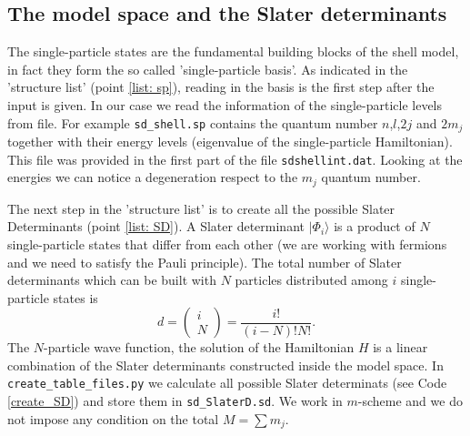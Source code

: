 \documentclass[twoside]{article}
\newcommand{\ket}[1]{| #1 \rangle}
\begin{document}
\subsection{The model space and the Slater determinants}

The single-particle states are the fundamental building blocks of the shell model, in fact they form the so called 'single-particle basis'. As indicated in the 'structure list' (point \ref{list: sp}), reading in the basis is the first step after the input is given. In our case we read the information of the single-particle levels from file. For example \texttt{sd\_shell.sp} contains the quantum number $n$,$l$,$2j$ and $2m_j$ together with their energy levels (eigenvalue of the single-particle Hamiltonian). This file was provided in the first part of the file \texttt{sdshellint.dat}\cite{file_link}. Looking at the energies we can notice a degeneration respect to the $m_j$ quantum number.


The next step in the 'structure list' is to create all the possible Slater Determinants (point \ref{list: SD}). A Slater determinant $\ket{\Phi_i}$ is a product of $N$ single-particle states that differ from each other (we are working with fermions and we need to satisfy the Pauli principle). The total number of Slater determinants which can be built with $N$ particles distributed among $i$ single-particle states is
\begin{equation}\label{binSD}
d=\left (\begin{array}{c} i \\ N\end{array} \right) =\frac{i!}{(i-N)!N!}. 
\end{equation}
The $N$-particle wave function, the solution of the Hamiltonian $H$ is a linear combination of the Slater determinants constructed inside the model space. In \texttt{create\_table\_files.py} we calculate all possible Slater determinats (see Code \ref{create_SD}) and store them in \texttt{sd\_SlaterD.sd}. We work in $m$-scheme and we do not impose any condition on the total $M= \sum m_j$.
\end{document}

